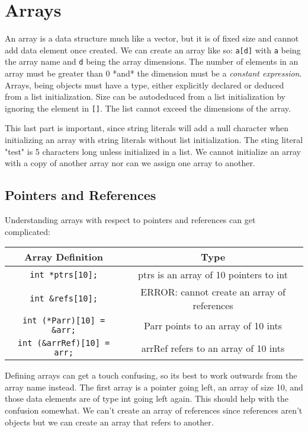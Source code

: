 \documentclass[12pt, a4paper]{report}
\begin{document}
\section{Arrays}
An array is a data structure much like a vector, but it is of fixed size and cannot add data element once created.
We can create an array like so: \verb|a[d]| with \verb|a| being the array name and \verb|d| being the array dimensions.
The number of elements in an array must be greater than 0 *and* the dimension must be a \emph{constant expression}.
Arrays, being objects must have a type, either explicitly declared or deduced from a list initialization.
Size can be autodeduced from a list initialization by ignoring the element in \verb|[]|.
The list cannot exceed the dimensions of the array. 

This last part is important, since string literals will add a null character when initializing an array with string literals without list initialization.
The sting literal "test" is 5 characters long unless initialized in a list.
We cannot initialize an array with a copy of another array nor can we assign one array to another.
\subsection{Pointers and References}
Understanding arrays with respect to pointers and references can get complicated:
\begin{center}
  \begin{tabular}{ |c|c| }
    \hline
    Array Definition & Type \\
    \hline
    \verb|int *ptrs[10];| & ptrs is an array of 10 pointers to int \\
    \hline
    \verb|int &refs[10];| & ERROR: cannot create an array of references \\
    \hline
    \verb|int (*Parr)[10] = &arr;| & Parr points to an array of 10 ints \\
    \hline
    \verb|int (&arrRef)[10] = arr;| & arrRef refers to an array of 10 ints \\
    \hline
  \end{tabular}
\end{center}
Defining arrays can get a touch confusing, so its best to work outwards from the array name instead.
The first array is a pointer going left, an array of size 10, and those data elements are of type int going left again.
This should help with the confusion somewhat.
We can't create an array of references since references aren't objects but we can create an array that refers to another.
\end{document}
